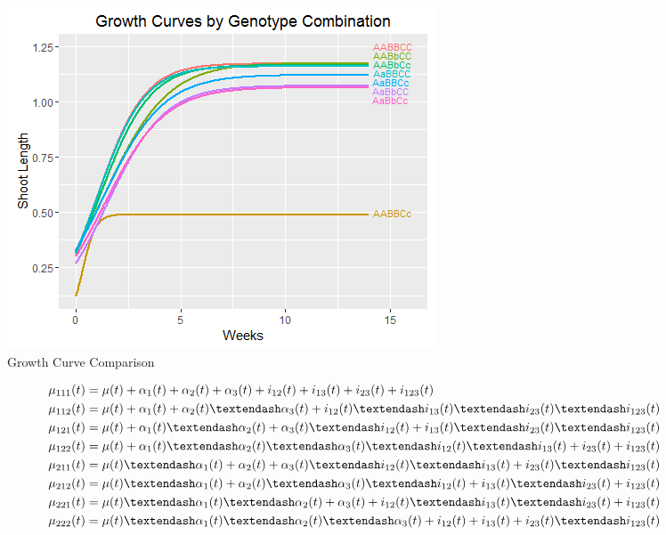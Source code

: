 \documentclass[11pt,]{book}
\theoremstyle{definition}
\theoremstyle{definition}
\theoremstyle{remark}
\begin{document}
\begin{figure}

{\centering \includegraphics[width=0.8\linewidth]{images/GrowthCurveComparison} 

}

\caption{Growth Curve Comparison}\label{fig:growth-compare}
\end{figure}

\begin{align}
\mu_{111}(t) &= \mu(t) + \alpha_1(t) + \alpha_2(t) + \alpha_3(t) + i_{12}(t) + i_{13}(t) + i_{23}(t) + i_{123}(t)  \notag \\
\mu_{112}(t) &= \mu(t) + \alpha_1(t) + \alpha_2(t) – \alpha_3(t) + i_{12}(t) – i_{13}(t) – i_{23}(t) – i_{123}(t)  \notag \\
\mu_{121}(t) &= \mu(t) + \alpha_1(t) – \alpha_2(t) + \alpha_3(t) – i_{12}(t) + i_{13}(t) – i_{23}(t) – i_{123}(t)  \notag \\
\mu_{122}(t) &= \mu(t) + \alpha_1(t) – \alpha_2(t) – \alpha_3(t) – i_{12}(t) – i_{13}(t) + i_{23}(t) + i_{123}(t)  \notag \\
\mu_{211}(t) &= \mu(t) – \alpha_1(t) + \alpha_2(t) + \alpha_3(t) – i_{12}(t) – i_{13}(t) + i_{23}(t) – i_{123}(t)  \notag \\
\mu_{212}(t) &= \mu(t) – \alpha_1(t) + \alpha_2(t) – \alpha_3(t) – i_{12}(t) + i_{13}(t) – i_{23}(t) + i_{123}(t)  \notag \\
\mu_{221}(t) &= \mu(t) – \alpha_1(t) – \alpha_2(t) + \alpha_3(t) + i_{12}(t) – i_{13}(t) – i_{23}(t) + i_{123}(t)  \notag \\
\mu_{222}(t) &= \mu(t) – \alpha_1(t) – \alpha_2(t) – \alpha_3(t) + i_{12}(t) + i_{13}(t) + i_{23}(t) – i_{123}(t)
\label{eq:genetic-effects}
\end{align}
\end{document}
